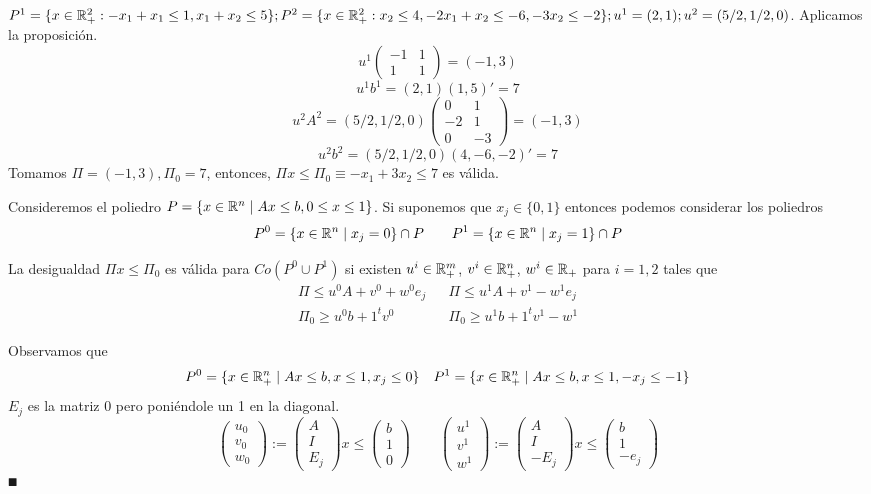 \documentclass[MIOP.tex]{subfiles}
\begin{document}
\begin{ej}
$P^1=\{x\in\mathbb{R}^2_+:-x_1+x_1\leq 1, x_1+x_2\leq 5\}; P^2=\{x\in\mathbb{R}^2_+:x_2\leq 4,-2x_1+x_2\leq -6, -3x_2\leq -2\}; u^1=(2,1);u^2=(5/2,1/2,0)$. Aplicamos la  proposición. 
$$
u^1\begin{pmatrix}
-1 & 1\\
1 & 1
\end{pmatrix}=(-1,3)
$$
$$u^1b^1=(2,1)(1,5)'=7$$
$$u^2A^2=(5/2,1/2,0)\begin{pmatrix}
0 & 1\\
-2 & 1\\
0 & -3
\end{pmatrix}=(-1,3)$$
$$
u^2b^2=(5/2, 1/2,0)(4, -6,-2)'=7$$
Tomamos $\Pi=(-1,3), \Pi_0=7$, entonces, $\Pi x\leq\Pi_0\equiv -x_1+3x_2\leq 7$ es válida.
\end{ej}
Consideremos el poliedro $P=\{x\in\mathbb{R}^n \mid Ax\leq b, 0\leq x \leq 1\}$. Si suponemos que $x_j\in\{0,1\}$ entonces podemos considerar los poliedros 
$$P^0=\{x\in\mathbb{R}^n \mid x_j =0\}\cap P \qquad P^1 =\{x\in\mathbb{R}^n \mid x_j=1\}\cap P
$$
\begin{prop}
La desigualdad $\Pi x\leq \Pi_0$ es válida para $Co(P^0 \cup P^1)$ si existen $u^i \in \mathbb{R}^m_+$, $v^i \in \mathbb{R}^n_+$, $w^i\in\mathbb{R}_+$ para $i=1,2$ tales que 
\begin{align*}
\Pi\leq u^0A + v^0 + w^0e_j && \Pi \leq u^1 A + v^1-w^1 e_j\\
\Pi_0 \geq u^0b+1^tv^0 && \Pi_0\geq u^1 b +1^t v^1 -w^1
\end{align*}
\end{prop}
\begin{dem}
Observamos que
$$
P^0=\{x\in\mathbb{R}^n_+\mid Ax \leq b, x\leq 1, x_j \leq 0\} \quad P^1=\{x\in\mathbb{R}^n_+\mid Ax \leq b, x\leq 1, -x_j \leq -1\}
$$
$E_j$ es la matriz 0 pero poniéndole un 1 en la diagonal.
$$
\begin{pmatrix}
u_0\\
v_0\\
w_0
\end{pmatrix}:=\begin{pmatrix}
A\\
I\\
E_j
\end{pmatrix}x \leq 
\begin{pmatrix}
b\\
1\\
0
\end{pmatrix}
\qquad
\begin{pmatrix}
u^1\\
v^1\\
w^1
\end{pmatrix} :=
\begin{pmatrix}
A\\
I\\
-E_j
\end{pmatrix}x \leq 
\begin{pmatrix}
b\\
1\\
-e_j
\end{pmatrix}
$$
$\QED$
\end{dem}
\end{document}
